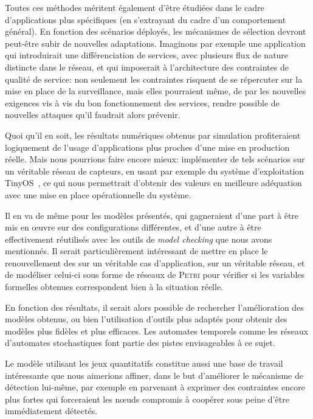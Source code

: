 Toutes ces méthodes méritent également d'être étudiées dans le cadre d'applications plus spécifiques (en s'extrayant du cadre d'un comportement général).
En fonction des scénarios déployés, les mécanismes de sélection devront peut-être subir de nouvelles adaptations.
Imaginons par exemple une application qui introduirait une différenciation de services, avec plusieurs flux de nature distincte dans le réseau, et qui imposerait à l'architecture des contraintes de qualité de service: non seulement les contraintes risquent de se répercuter sur la mise en place de la surveillance, mais elles pourraient même, de par les nouvelles exigences vis à vis du bon fonctionnement des services, rendre possible de nouvelles attaques qu'il faudrait alors prévenir.

Quoi qu'il en soit, les résultats numériques obtenus par simulation profiteraient logiquement de l'usage d'applications plus proches d'une mise en production réelle.
Mais nous pourrions faire encore mieux: implémenter de tels scénarios sur un véritable réseau de capteurs, en usant par exemple du système d'exploitation TinyOS~\cite{tinyos}, ce qui nous permettrait d'obtenir des valeurs en meilleure adéquation avec une mise en place opérationnelle du système.

Il en va de même pour les modèles présentés, qui gagneraient d'une part à être mis en œuvre sur des configurations différentes, et d'une autre à être effectivement réutilisés avec les outils de \textit{model checking} que nous avons mentionnés.
Il serait particulièrement intéressant de mettre en place le renouvellement des \cnst sur un véritable cas d'application, sur un véritable réseau, et de modéliser celui-ci sous forme de réseaux de \textsc{Petri} pour vérifier si les variables formelles obtenues correspondent bien à la situation réelle.

En fonction des résultats, il serait alors possible de rechercher l'amélioration des modèles obtenus, ou bien l'utilisation d'outils plus adaptés pour obtenir des modèles plus fidèles et plus efficaces.
Les automates temporels comme les réseaux d'automates stochastiques font partie des pistes envisageables à ce sujet.

Le modèle utilisant les jeux quantitatifs constitue aussi une base de travail intéressante que nous aimerions affiner, dans le but d'améliorer le mécanisme de détection lui-même, par exemple en parvenant à exprimer des contraintes encore plus fortes qui forceraient les nœuds compromis à coopérer sous peine d'être immédiatement détectés.

